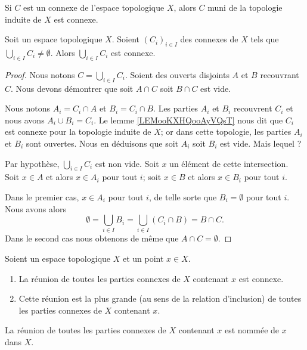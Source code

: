 \begin{lemma}		\label{LEMooKXHQooAyVQsT}
	Si \( C\) est un connexe de l'espace topologique \( X\), alors \( C\) muni de la topologie induite de \( X\) est connexe.
\end{lemma}

\begin{proposition}		\label{PROPooBCFXooRlMvch}
	Soit un espace topologique \( X\). Soient \( (C_i)_{i\in I}\) des connexes de \( X\) tels que \( \bigcup_{i\in I}C_i\neq \emptyset\). Alors \( \bigcup_{i\in I}C_i\) est connexe.
\end{proposition}

\begin{proof}
	Nous notons \( C=\bigcup_{i\in I}C_i\). Soient des ouverts disjoints \( A\) et \( B\) recouvrant \( C\). Nous devons démontrer que soit \( A\cap C\) soit \( B\cap C\) est vide.

	Nous notons \( A_i=C_i\cap A\) et \( B_i=C_i\cap B\). Les parties \( A_i\) et \( B_i\) recouvrent \( C_i\) et nous avons \( A_i\cup B_i=C_i\). Le lemme \ref{LEMooKXHQooAyVQsT} nous dit que \( C_i\) est connexe pour la topologie induite de \( X\); or dans cette topologie, les parties \( A_i\) et \( B_i\) sont ouvertes. Nous en déduisons que soit \( A_i\) soit \( B_i\) est vide. Mais lequel ?

	Par hypothèse, \( \bigcup_{i\in I}C_i\) est non vide. Soit \( x\) un élément de cette intersection. Soit \( x\in A\) et alors \( x\in A_i\) pour tout \( i\); soit \( x\in B\) et alors \( x\in B_i\) pour tout \( i\).

	Dans le premier cas, \( x\in A_i\) pour tout \( i\), de telle sorte que \( B_i=\emptyset\) pour tout \( i\). Nous avons alors
	\begin{equation}
		\emptyset=\bigcup_{i\in I}B_i=\bigcup_{i\in I}(C_i\cap B)=B\cap C.
	\end{equation}
	Dans le second cas nous obtenons de même que \( A\cap C=\emptyset\).
\end{proof}


\begin{propositionDef}        \label{DEFooFHXNooJGUPPn}
	Soient un espace topologique \( X\) et un point \( x\in X\).
	\begin{enumerate}
		\item		\label{ITEMooBZAQooNwuzaS}
		      La réunion de toutes les parties connexes de \( X\) contenant \( x\) est connexe.
		\item
		      Cette réunion est la plus grande (au sens de la relation d'inclusion) de toutes les parties connexes de \( X\) contenant \( x\).
	\end{enumerate}
	La réunion de toutes les parties connexes de \( X\) contenant \( x\) est nommée  de \( x\) dans \( X\).
\end{propositionDef}

